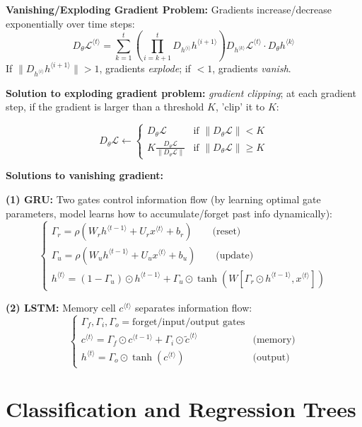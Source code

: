 \documentclass[a4paper,10pt]{article}
\begin{document}
\begin{small}
\textbf{Vanishing/Exploding Gradient Problem:} Gradients increase/decrease exponentially over time steps:
$$
D_{\theta} \mathcal{L}^{\langle t \rangle} = \sum_{k=1}^{t} \left( \prod_{i=k+1}^{t} D_{h^{\langle i \rangle}} h^{\langle i+1 \rangle} \right) D_{h^{\langle k \rangle}} \mathcal{L}^{\langle t \rangle} \cdot D_{\theta} h^{\langle k \rangle}
$$
If $ \| D_{h^{\langle i \rangle}} h^{\langle i+1 \rangle} \| > 1 $, gradients \textit{explode}; if $ < 1 $, gradients \textit{vanish}.

\textbf{Solution to exploding gradient problem:} \textit{gradient clipping}; at each gradient step, if the gradient is larger than a threshold $K$, 'clip' it to $K$:

$$
D_\theta \mathcal{L} \leftarrow 
\begin{cases} 
D_\theta \mathcal{L} & \text{if } \|D_\theta \mathcal{L}\| < K \\ 
K \frac{D_\theta \mathcal{L}}{\|D_\theta \mathcal{L}\|} & \text{if } \|D_\theta \mathcal{L}\| \geq K 
\end{cases}
$$

\textbf{Solutions to vanishing gradient:}

\textbf{(1) GRU:} Two gates control information flow (by learning optimal gate parameters, model learns how to accumulate/forget past info dynamically):
$$\begin{cases}
\Gamma_r = \rho(W_r h^{\langle t-1 \rangle} + U_r x^{\langle t \rangle} + b_r)  \quad \quad \text{(reset)} \\
\Gamma_u = \rho(W_u h^{\langle t-1 \rangle} + U_u x^{\langle t \rangle} + b_u) \quad \quad \text{(update)} \\
h^{\langle t \rangle} = (1-\Gamma_u) \odot h^{\langle t-1 \rangle} + \Gamma_u \odot \tanh(W[\Gamma_r \odot h^{\langle t-1 \rangle}, x^{\langle t \rangle}])
\end{cases}$$

\textbf{(2) LSTM:} Memory cell $c^{\langle t \rangle}$ separates information flow:
$$\begin{cases}
\Gamma_f, \Gamma_i, \Gamma_o = \text{forget/input/output gates} \\
c^{\langle t \rangle} = \Gamma_f \odot c^{\langle t-1 \rangle} + \Gamma_i \odot \tilde{c}^{\langle t \rangle} & \text{(memory)} \\
h^{\langle t \rangle} = \Gamma_o \odot \tanh(c^{\langle t \rangle}) & \text{(output)}
\end{cases}$$


\section{Classification and Regression Trees}

\end{small}
\end{document}
